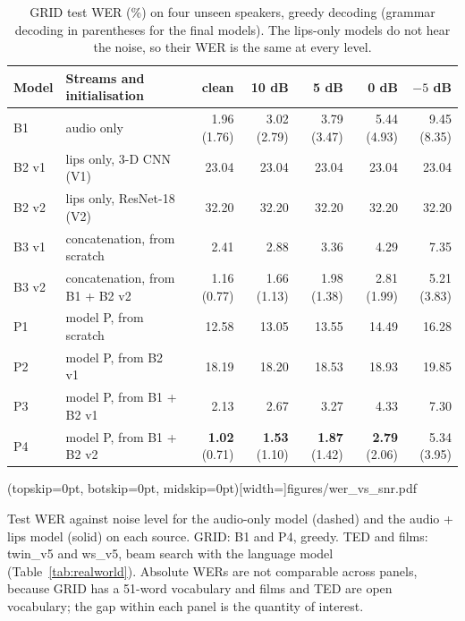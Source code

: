 \begin{table}[t]
\caption{GRID test WER (\%) on four unseen speakers, greedy decoding (grammar decoding in
parentheses for the final models). The lips-only models do not hear the noise, so their WER is the
same at every level.}
\label{tab:grid}
\centering
\setlength{\tabcolsep}{5pt}
\begin{tabular}{llrrrrr}
\toprule
Model & Streams and initialisation & clean & 10 dB & 5 dB & 0 dB & $-5$ dB \\
\midrule
B1      & audio only                         & 1.96 (1.76) & 3.02 (2.79) & 3.79 (3.47) & 5.44 (4.93) & 9.45 (8.35) \\
B2 v1   & lips only, 3-D CNN (V1)            & 23.04 & 23.04 & 23.04 & 23.04 & 23.04 \\
B2 v2   & lips only, ResNet-18 (V2)          & 32.20 & 32.20 & 32.20 & 32.20 & 32.20 \\
B3 v1   & concatenation, from scratch        & 2.41 & 2.88 & 3.36 & 4.29 & 7.35 \\
B3 v2   & concatenation, from B1 + B2 v2     & 1.16 (0.77) & 1.66 (1.13) & 1.98 (1.38) & 2.81 (1.99) & 5.21 (3.83) \\
\midrule
P1      & model P, from scratch              & 12.58 & 13.05 & 13.55 & 14.49 & 16.28 \\
P2      & model P, from B2 v1                & 18.19 & 18.20 & 18.53 & 18.93 & 19.85 \\
P3      & model P, from B1 + B2 v1           & 2.13 & 2.67 & 3.27 & 4.33 & 7.30 \\
P4      & model P, from B1 + B2 v2           & \textbf{1.02} (0.71) & \textbf{1.53} (1.10) & \textbf{1.87} (1.42) & \textbf{2.79} (2.06) & 5.34 (3.95) \\
\bottomrule
\end{tabular}
\end{table}

\Figure[t!](topskip=0pt, botskip=0pt, midskip=0pt)[width=\textwidth]{figures/wer_vs_snr.pdf}
{\parbox[t]{0.9\textwidth}{Test WER against noise level for the audio-only model (dashed) and the
audio + lips model (solid) on each source. GRID: B1 and P4, greedy. TED and films: twin\_v5 and
ws\_v5, beam search with the language model (Table~\ref{tab:realworld}). Absolute WERs are not
comparable across panels, because GRID has a 51-word vocabulary and films and TED are open
vocabulary; the gap within each panel is the quantity of interest.}\label{fig:wersnr}}

